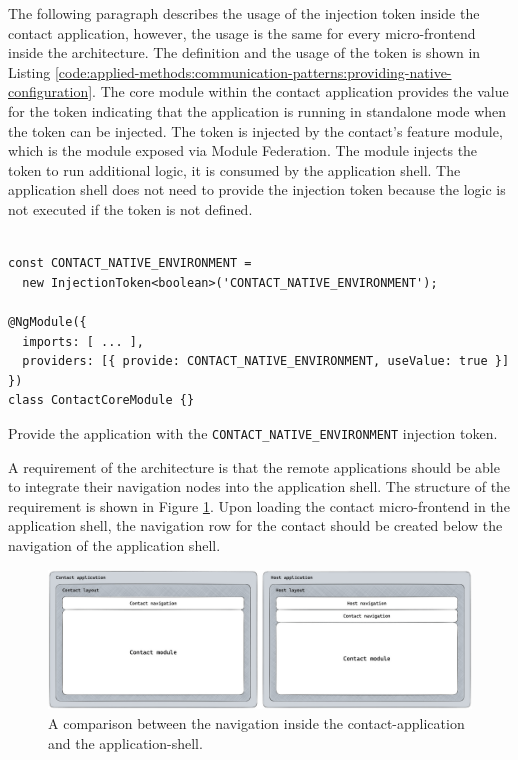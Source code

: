 \bigskip

\noindent The following paragraph describes the usage of the injection token inside the contact application, however, the usage is the same for every micro-frontend inside the architecture. The definition and the usage of the token is shown in Listing \ref{code:applied-methods:communication-patterns:providing-native-configuration}. The core module within the contact application provides the value for the token indicating that the application is running in standalone mode when the token can be injected. The token is injected by the contact's feature module, which is the module exposed via Module Federation. The module injects the token to run additional logic, it is consumed by the application shell. The application shell does not need to provide the injection token because the logic is not executed if the token is not defined.

\ifshowListings
\begin{listing}[H]
  \begin{verbatim}

const CONTACT_NATIVE_ENVIRONMENT = 
  new InjectionToken<boolean>('CONTACT_NATIVE_ENVIRONMENT');

@NgModule({
  imports: [ ... ],
  providers: [{ provide: CONTACT_NATIVE_ENVIRONMENT, useValue: true }]
})
class ContactCoreModule {}
  \end{verbatim}
  \caption{Provide the application with the \texttt{CONTACT\_NATIVE\_ENVIRONMENT} injection token.}\label{code:applied-methods:communication-patterns:providing-native-configuration}
\end{listing}
\fi

\noindent A requirement of the architecture is that the remote applications should be able to integrate their navigation nodes into the application shell. The structure of the requirement is shown in Figure \ref{fig:applied-methods:communication-patterns:comparison-between-host-and-contact-layout}. Upon loading the contact micro-frontend in the application shell, the navigation row for the contact should be created below the navigation of the application shell.

\ifshowImages
  \begin{figure}[H]
  \centering
  \includegraphics[width=1\linewidth]{images/applied-methods/communication-patterns/layout-comparison.jpg}
  \caption{A comparison between the navigation inside the contact-application and the application-shell.}\label{fig:applied-methods:communication-patterns:comparison-between-host-and-contact-layout}
  \end{figure}
\fi

